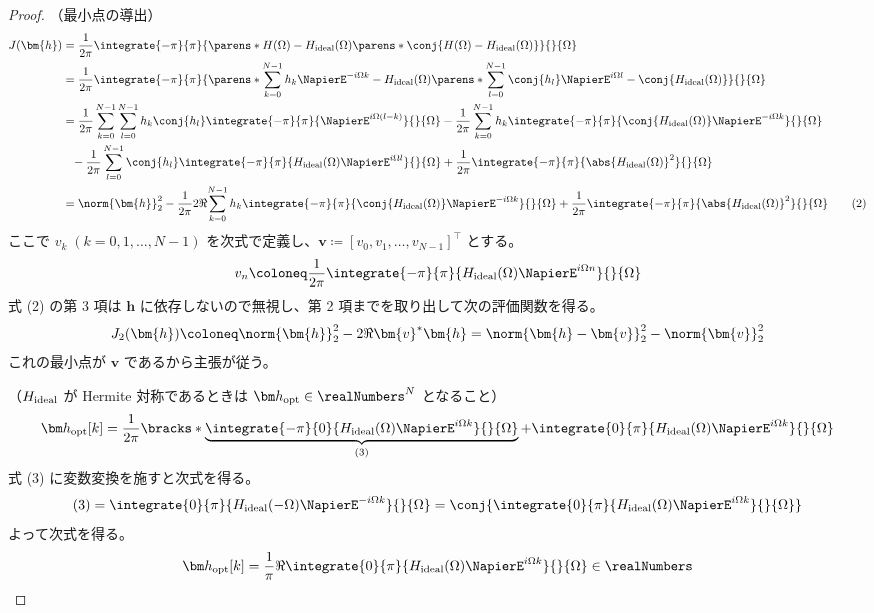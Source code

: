             \begin{proof}
                \quad\par\noindent
                （最小点の導出）
                \begin{align*}
                    J(\bm{h}) &= \frac{1}{2\pi}\integrate{-\pi}{\pi}{\parens*{H(\Omega)-\Hideal(\Omega)}\parens*{\conj{H(\Omega)-\Hideal(\Omega)}}}{}{\Omega} \\
                    &= \frac{1}{2\pi}\integrate{-\pi}{\pi}{\parens*{\sum_{k=0}^{N-1} h_k\NapierE^{-i\Omega k} -\Hideal(\Omega)}\parens*{\sum_{l=0}^{N-1} \conj{h_l}\NapierE^{i\Omega l} -\conj{\Hideal(\Omega)}}}{}{\Omega} \\
                    &= \frac{1}{2\pi}\sum_{k=0}^{N-1}\sum_{l=0}^{N-1} h_k\conj{h_l}\integrate{-\pi}{\pi}{\NapierE^{i\Omega(l-k)}}{}{\Omega} - \frac{1}{2\pi}\sum_{k=0}^{N-1} h_k\integrate{-\pi}{\pi}{\conj{\Hideal(\Omega)}\NapierE^{-i\Omega k}}{}{\Omega} \\
                    &\phantom{=}- \frac{1}{2\pi}\sum_{l=0}^{N-1} \conj{h_l}\integrate{-\pi}{\pi}{\Hideal(\Omega)\NapierE^{i\Omega l}}{}{\Omega} + \frac{1}{2\pi}\integrate{-\pi}{\pi}{\abs{\Hideal(\Omega)}^2}{}{\Omega} \\
                    &= \norm{\bm{h}}_2^2 - \frac{1}{2\pi}2\Re{\sum_{k=0}^{N-1} h_k\integrate{-\pi}{\pi}{\conj{\Hideal(\Omega)}\NapierE^{-i\Omega k}}{}{\Omega}} + \frac{1}{2\pi}\integrate{-\pi}{\pi}{\abs{\Hideal(\Omega)}^2}{}{\Omega} \tag{2}
                \end{align*}
                ここで $v_k\;(k=0,1,\dots,N-1)$ を次式で定義し、$\bm{v}\coloneq[v_0,v_1,\dots,v_{N-1}]^\top$ とする。
                \[ v_n \coloneq \frac{1}{2\pi}\integrate{-\pi}{\pi}{\Hideal(\Omega)\NapierE^{i\Omega n}}{}{\Omega} \]
                式 (2) の第 3 項は $\bm{h}$ に依存しないので無視し、第 2 項までを取り出して次の評価関数を得る。
                \[ J_2(\bm{h}) \coloneq \norm{\bm{h}}_2^2 - 2\Re{\bm{v}^*\bm{h}} = \norm{\bm{h} - \bm{v}}_2^2 - \norm{\bm{v}}_2^2 \]
                これの最小点が $\bm{v}$ であるから主張が従う。
                \newline
                \par\noindent
                （$H_\text{ideal}$ が Hermite 対称であるときは $\vhOpt\in\realNumbers^N$ となること）
                \[ \vhOpt[k] = \frac{1}{2\pi}\bracks*{\underbrace{\integrate{-\pi}{0}{\Hideal(\Omega)\NapierE^{i\Omega k}}{}{\Omega}}_{(3)} + \integrate{0}{\pi}{\Hideal(\Omega)\NapierE^{i\Omega k}}{}{\Omega}} \]
                式 (3) に変数変換を施すと次式を得る。
                \[ (3) = \integrate{0}{\pi}{\Hideal(-\Omega)\NapierE^{-i\Omega k}}{}{\Omega} = \conj{\integrate{0}{\pi}{\Hideal(\Omega)\NapierE^{i\Omega k}}{}{\Omega}} \]
                よって次式を得る。
                \[ \vhOpt[k] = \frac{1}{\pi}\Re{\integrate{0}{\pi}{\Hideal(\Omega)\NapierE^{i\Omega k}}{}{\Omega}}\in\realNumbers \]
            \end{proof}
